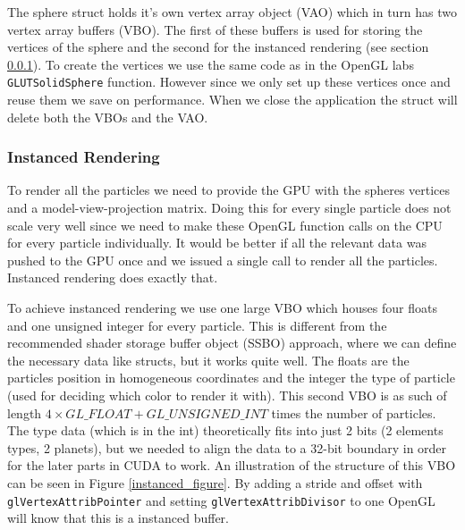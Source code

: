 \documentclass[a4paper]{article}
\begin{document}
The sphere struct holds it's own vertex array object (VAO) which in turn has two vertex array buffers (VBO). 
The first of these buffers is used for storing the vertices of the sphere and the second for the instanced rendering (see section \ref{instanced}). 
To create the vertices we use the same code as in the OpenGL labs \verb|GLUTSolidSphere| function. 
However since we only set up these vertices once and reuse them we save on performance.
When we close the application the struct will delete both the VBOs and the VAO. 

\subsubsection{Instanced Rendering}
\label{instanced}

To render all the particles we need to provide the GPU with the spheres vertices and a model-view-projection matrix. 
Doing this for every single particle does not scale very well since we need to make these OpenGL function calls on the CPU for every particle individually.
It would be better if all the relevant data was pushed to the GPU once and we issued a single call to render all the particles. 
Instanced rendering does exactly that. 

To achieve instanced rendering we use one large VBO which houses four floats and one unsigned integer for every particle. 
This is different from the recommended shader storage buffer object (SSBO) approach, where we can define the necessary data like structs, but it works quite well. 
The floats are the particles position in homogeneous coordinates and the integer the type of particle (used for deciding which color to render it with). 
This second VBO is as such of length $4 \times GL\_FLOAT + GL\_UNSIGNED\_INT$ times the number of particles. 
The type data (which is in the int) theoretically fits into just 2 bits (2 elements types, 2 planets), but we needed to align the data to a 32-bit boundary in order for the later parts in CUDA to work.
An illustration of the structure of this VBO can be seen in Figure \ref{instanced_figure}.
By adding a stride and offset with \verb|glVertexAttribPointer| and setting \verb|glVertexAttribDivisor| to one OpenGL will know that this is a instanced buffer. 
\end{document}
